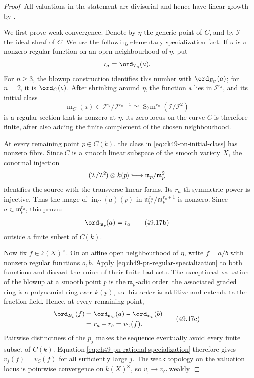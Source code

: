 \begin{proof}
All valuations in the statement are divisorial and hence have linear growth
by \cite[Proposition~1.28]{BJ22}.

We first prove weak convergence.  Denote by $\eta$ the generic point of
$C$, and by $\mathcal I$ the ideal sheaf of $C$.  We use the following
elementary specialization fact.  If $a$ is a nonzero regular function on
an open neighbourhood of $\eta$, put
\[
 r_a=\ord_{\mathcal I_\eta}(a).
\]
For $n\ge3$, the blowup construction identifies this number with
$\ord_{E_C}(a)$; for $n=2$, it is $\ord_C(a)$.  After shrinking
around $\eta$, the function $a$ lies in $\mathcal I^{r_a}$, and its
initial class
\[
 \operatorname{in}_C(a)
 \in \mathcal I^{r_a}/\mathcal I^{r_a+1}
 \simeq \operatorname{Sym}^{r_a}(\mathcal I/\mathcal I^2)
\tag{49.17a}\label{eq:ch49-pn-initial-class}
\]
is a regular section that is nonzero at $\eta$.  Its zero locus on the
curve $C$ is therefore finite, after also adding the finite complement of
the chosen neighbourhood.

At every remaining point $p\in C(k)$, the class in
\eqref{eq:ch49-pn-initial-class} has nonzero fibre.  Since $C$ is a smooth
linear subspace of the smooth variety $X$, the conormal injection
\[
 (\mathcal I/\mathcal I^2)\otimes k(p)
 \lhook\joinrel\longrightarrow
 \mathfrak m_p/\mathfrak m_p^2
\]
identifies the source with the transverse linear forms.  Its $r_a$-th
symmetric power is injective.  Thus the image of
$\operatorname{in}_C(a)(p)$ in
$\mathfrak m_p^{r_a}/\mathfrak m_p^{r_a+1}$ is nonzero.  Since
$a\in\mathfrak m_p^{r_a}$, this proves
\[
             \ord_{\mathfrak m_p}(a)=r_a
\tag{49.17b}\label{eq:ch49-pn-regular-specialization}
\]
outside a finite subset of $C(k)$.

Now fix $f\in k(X)^\times$.  On an affine open neighbourhood of $\eta$,
write $f=a/b$ with nonzero regular functions $a,b$.  Apply
\eqref{eq:ch49-pn-regular-specialization} to both functions and discard the
union of their finite bad sets.  The exceptional valuation of the blowup at
a smooth point $p$ is the $\mathfrak m_p$-adic order: the associated
graded ring is a polynomial ring over $k(p)$, so this order is additive
and extends to the fraction field.  Hence, at every remaining point,
\[
 \begin{aligned}
  \ord_{E_p}(f)
    &=\ord_{\mathfrak m_p}(a)-\ord_{\mathfrak m_p}(b)\\
    &=r_a-r_b=v_C(f).
 \end{aligned}
\tag{49.17c}\label{eq:ch49-pn-rational-specialization}
\]
Pairwise distinctness of the $p_j$ makes the sequence eventually avoid
every finite subset of $C(k)$.  Equation
\eqref{eq:ch49-pn-rational-specialization} therefore gives
$v_j(f)=v_C(f)$ for all sufficiently large $j$.  The weak topology on
the valuation locus is pointwise convergence on $k(X)^\times$, so
$v_j\to v_C$ weakly.


\end{proof}
